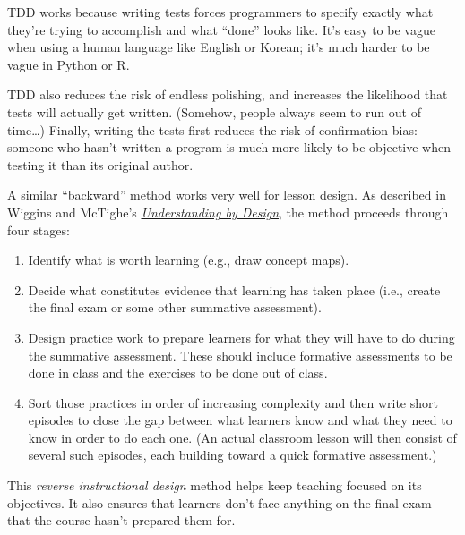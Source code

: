 TDD works because writing tests forces programmers to specify
exactly what they're trying to accomplish and what ``done'' looks like.
It's easy to be vague when using a human language like English or Korean;
it's much harder to be vague in Python or R.

TDD also reduces the risk of endless polishing,
and increases the likelihood that tests will actually get written.
(Somehow, people always seem to run out of time\ldots{})
Finally,
writing the tests first reduces the risk of confirmation bias:
someone who hasn't written a program is much more likely to be objective when testing it
than its original author.

A similar ``backward'' method works very well for lesson design.
As described in Wiggins and McTighe's
\emph{\href{http://www.amazon.com/Understanding-Design-Expanded-Grant-Wiggins/dp/0131950843/}{Understanding by Design}},
the method proceeds through four stages:

\begin{enumerate}
\item Identify what is worth learning (e.g., draw concept maps).
\item Decide what constitutes evidence that learning has taken place
(i.e., create the final exam or some other summative assessment).
\item Design practice work to prepare learners for what they will have to do during the summative assessment.
These should include formative assessments to be done in class
and the exercises to be done out of class.
\item Sort those practices in order of increasing complexity
and then write short episodes to close the gap between what learners know and what they need to know
in order to do each one.
(An actual classroom lesson will then consist of several such episodes,
each building toward a quick formative assessment.)
\end{enumerate}

This \emph{reverse instructional design} method helps keep teaching focused on its objectives.
It also ensures that learners don't face anything on the final exam that the course hasn't prepared them for.

